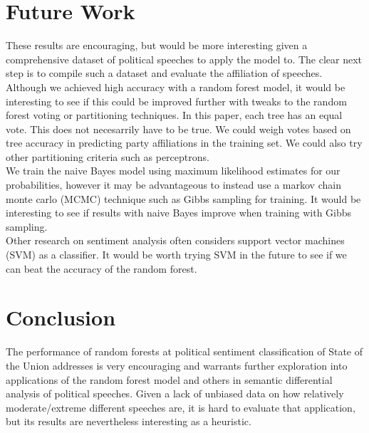 \documentclass{amsart}
\theoremstyle{definition}
\theoremstyle{remark}
\numberwithin{equation}{section}
\begin{document}
\section{Future Work}
These results are encouraging, but would be more interesting given a comprehensive dataset of political speeches to apply the model to. The clear next step is to compile such a dataset and evaluate the affiliation of speeches.\\
Although we achieved high accuracy with a random forest model, it would be interesting to see if this could be improved further with tweaks to the random forest voting or partitioning techniques. In this paper, each tree has an equal vote. This does not necesarrily have to be true. We could weigh votes based on tree accuracy in predicting party affiliations in the training set. We could also try other partitioning criteria such as perceptrons.\\
We train the naive Bayes model using maximum likelihood estimates for our probabilities, however it may be advantageous to instead use a markov chain monte carlo (MCMC) technique such as Gibbs sampling for training. It would be interesting to see if results with naive Bayes improve when training with Gibbs sampling.\\
Other research on sentiment analysis often considers support vector machines (SVM) as a classifier. It would be worth trying SVM in the future to see if we can beat the accuracy of the random forest.\\

\section{Conclusion}
The performance of random forests at political sentiment classification of State of the Union addresses is very encouraging and warrants further exploration into applications of the random forest model and others in semantic differential analysis of political speeches. Given a lack of unbiased data on how relatively moderate/extreme different speeches are, it is hard to evaluate that application, but its results are nevertheless interesting as a heuristic.\\

\newpage
\end{document}
